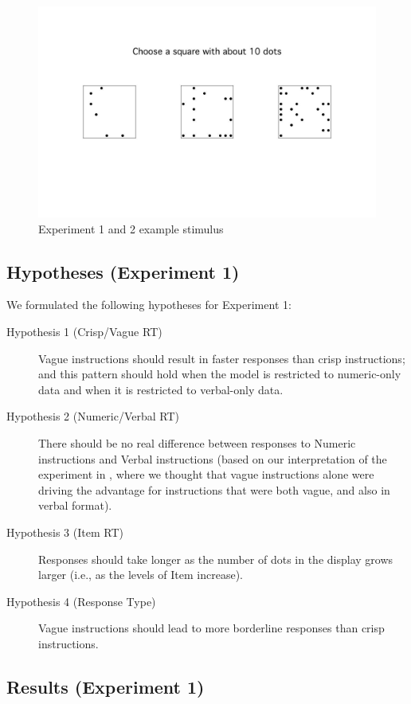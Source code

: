\begin{figure}[htbp]
\centering
\includegraphics[width=.75\textwidth]{figures/Ce1-example-screenshot}
\caption{Experiment 1 and 2 example stimulus}
\label{Experiment1and2examplestimulus}
\end{figure}

\subsection{Hypotheses (Experiment 1)} 

We formulated the following hypotheses for Experiment 1:

\begin{description}
	\item [Hypothesis 1 (Crisp/Vague RT)] Vague instructions should result in faster responses than crisp instructions; and this pattern should hold when the model is restricted to numeric-only data and when it is restricted to verbal-only data.
	\item [Hypothesis 2 (Numeric/Verbal RT)] There should be no real difference between responses to Numeric instructions and Verbal instructions (based on our interpretation of the experiment in \citet{green2013utility}, where we thought that vague instructions alone were driving the advantage for instructions that were both vague, and also in verbal format).
	\item [Hypothesis 3 (Item RT)] Responses should take longer as the number of dots in the display grows larger (i.e., as the levels of Item increase).
	\item [Hypothesis 4 (Response Type)] Vague instructions should lead to more borderline responses than crisp instructions.
\end{description}

\subsection{Results (Experiment 1)} 

